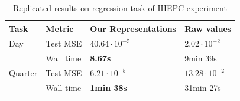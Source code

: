 \documentclass{article}
\begin{document}

\begin{table}[h!]
\caption{Replicated results on regression task of IHEPC experiment}
\label{tab:ihepc}
\centering
\begin{tabular}{llll}
\hline
Task    & Metric    & Our Representations       & Raw values \\ \hline
Day     & Test MSE  &     $40.64 \cdot 10 ^{-5}$ & $2.02 \cdot 10^{-2}$ \\ 
        & Wall time &        \textbf{8.67s}            &  9min 39s  \\ \hline
Quarter & Test MSE  &   $6.21 \cdot 10^{-5}$ & $13.28 \cdot 10^{-2}$ \\ 
        & Wall time &       \textbf{1min 38s}      & 31min 27s      \\ \hline
\end{tabular}
\end{table}

\end{document}
